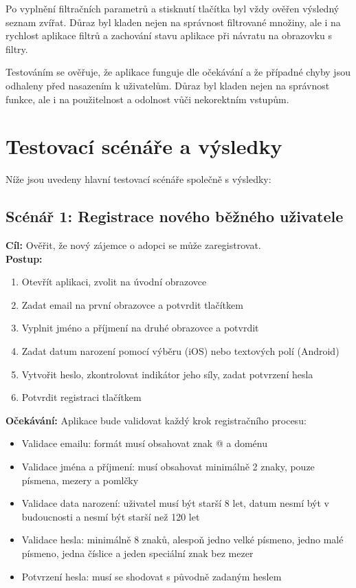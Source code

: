 \documentclass[czech, bp, kiv, he, iso690numb, pdf]{fasthesis}
\begin{document}
    Po vyplnění filtračních parametrů a stisknutí tlačítka  byl vždy ověřen výsledný seznam zvířat. Důraz byl kladen nejen na správnost filtrované množiny, ale i na rychlost aplikace filtrů a zachování stavu aplikace při návratu na obrazovku s filtry.

    Testováním se ověřuje, že aplikace funguje dle očekávání a že případné chyby jsou odhaleny před nasazením k uživatelům. Důraz byl kladen nejen na správnost funkce, ale i na použitelnost a odolnost vůči nekorektním vstupům.

    \section{Testovací scénáře a výsledky}

    Níže jsou uvedeny hlavní testovací scénáře společně s výsledky:

    \subsection*{Scénář 1: Registrace nového běžného uživatele}

    \textbf{Cíl:} Ověřit, že nový zájemce o adopci se může zaregistrovat.\\

    \noindent \textbf{Postup:}
    \begin{enumerate}
        \item Otevřít aplikaci, zvolit  na úvodní obrazovce
        \item Zadat email na první obrazovce a potvrdit tlačítkem 
        \item Vyplnit jméno a příjmení na druhé obrazovce a potvrdit
        \item Zadat datum narození pomocí výběru (iOS) nebo textových polí (Android)
        \item Vytvořit heslo, zkontrolovat indikátor jeho síly, zadat potvrzení hesla
        \item Potvrdit registraci tlačítkem 
    \end{enumerate}

    \noindent \textbf{Očekávání:} Aplikace bude validovat každý krok registračního procesu:
    \begin{itemize}
        \item Validace emailu: formát musí obsahovat znak @ a doménu
        \item Validace jména a příjmení: musí obsahovat minimálně 2 znaky, pouze písmena, mezery a pomlčky
        \item Validace data narození: uživatel musí být starší 8 let, datum nesmí být v budoucnosti a nesmí být starší než 120 let
        \item Validace hesla: minimálně 8 znaků, alespoň jedno velké písmeno, jedno malé písmeno, jedna číslice a jeden speciální znak bez mezer
        \item Potvrzení hesla: musí se shodovat s původně zadaným heslem
    \end{itemize}
\end{document}

